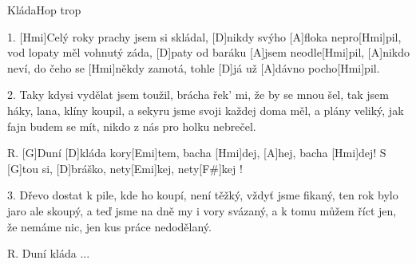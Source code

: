 \begin{song}{Kláda}{Hop trop}

\begin{xverse}{1. }
[Hmi]Celý roky prachy jsem si skládal,
[D]nikdy svýho [A]floka nepro[Hmi]pil,
vod lopaty měl vohnutý záda,
[D]paty od baráku [A]jsem neodle[Hmi]pil,
[A]nikdo neví, do čeho se [Hmi]někdy zamotá,
tohle [D]já už [A]dávno pocho[Hmi]pil.
\end{xverse}


\begin{xverse}{2. }
Taky kdysi vydělat jsem toužil,
brácha řek' mi, že by se mnou šel,
tak jsem háky, lana, klíny koupil,
a sekyru jsme svoji každej doma měl,
a plány veliký, jak fajn budem se mít,
nikdo z nás pro holku nebrečel.
\end{xverse}


\begin{xverse}{R. }
[G]Duní [D]kláda kory[Emi]tem, bacha [Hmi]dej, [A]hej, bacha [Hmi]dej!
S [G]tou si, [D]bráško, nety[Emi]kej, nety[F#]kej !
\end{xverse}


\begin{xverse}{3. }
Dřevo dostat k pile, kde ho koupí,
není těžký, vždyť jsme fikaný,
ten rok bylo jaro ale skoupý,
a teď jsme na dně my i vory svázaný,
a k tomu můžem říct jen, že nemáme nic,
jen kus práce nedodělaný.
\end{xverse}


\begin{xverse}{R. }
Duní kláda ...
\end{xverse}
\end{song}

